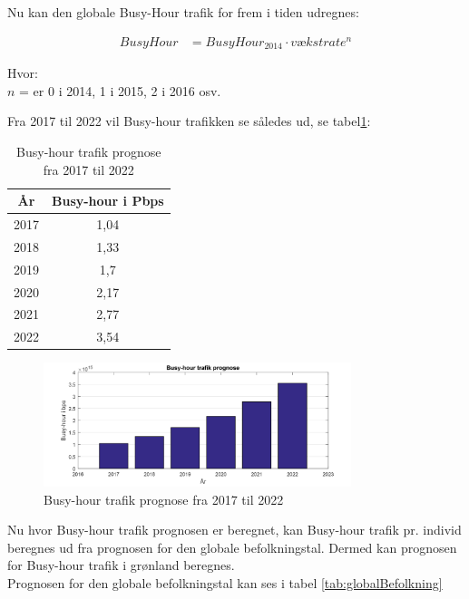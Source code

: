 Nu kan den globale Busy-Hour trafik for frem i tiden udregnes:

\begin{align}
	Busy Hour &= Busy Hour_{2014} \cdot vækstrate^n
\end{align}
\begin{tabbing}
Hvor:\\
	$ n $ = er 0 i 2014, 1 i 2015, 2 i 2016 osv.
\end{tabbing}
Fra 2017 til 2022 vil Busy-hour trafikken se således ud, se tabel\ref{tab:prognose}:
\begin{table}[!h]
	\centering
    \begin{tabular}{|c|c|}
    \hline
    År   & Busy-hour i Pbps \\ \hline
    2017 & 1,04             \\ \hline
    2018 & 1,33             \\ \hline
    2019 & 1,7              \\ \hline
    2020 & 2,17             \\ \hline
    2021 & 2,77             \\ \hline
    2022 & 3,54             \\ \hline
    \end{tabular}
    \label{tab:prognose}
    \caption{Busy-hour trafik prognose fra 2017 til 2022}
\end{table}
\begin{figure}[h]
	\centering
	\includegraphics[width=0.8\textwidth]{figure/busyHourPrognose.pdf}
	\caption{Busy-hour trafik prognose fra 2017 til 2022}
	\label{fig:prognose}
\end{figure}
Nu hvor Busy-hour trafik prognosen er beregnet, kan Busy-hour trafik pr. individ beregnes ud fra prognosen for den globale befolkningstal. Dermed kan prognosen for Busy-hour trafik i grønland beregnes.\\
Prognosen for den globale befolkningstal kan ses i tabel \ref{tab:globalBefolkning}
